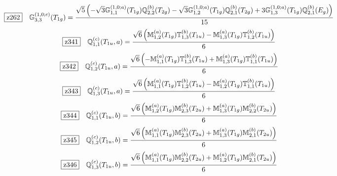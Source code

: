 \documentclass[fleqn,10pt,landscape]{jsarticle}
\begin{document}
\begin{dmath*}
\hspace*{3mm}\fbox{z262}\quad \mathbb{G}_{3,3}^{(1,0;c)}(T_{1g})=\frac{\sqrt{5} \left(- \sqrt{3} \mathbb{G}_{1,1}^{(1,0;a)}(T_{1g}) \mathbb{Q}_{2,2}^{(b)}(T_{2g}) - \sqrt{3} \mathbb{G}_{1,2}^{(1,0;a)}(T_{1g}) \mathbb{Q}_{2,1}^{(b)}(T_{2g}) + 3 \mathbb{G}_{1,3}^{(1,0;a)}(T_{1g}) \mathbb{Q}_{2,1}^{(b)}(E_{g})\right)}{15}
\end{dmath*}
\begin{dmath*}
\hspace*{3mm}\fbox{z341}\quad \mathbb{Q}_{1,1}^{(c)}(T_{1u},a)=\frac{\sqrt{6} \left(\mathbb{M}_{1,2}^{(a)}(T_{1g}) \mathbb{T}_{1,3}^{(b)}(T_{1u}) - \mathbb{M}_{1,3}^{(a)}(T_{1g}) \mathbb{T}_{1,2}^{(b)}(T_{1u})\right)}{6}
\end{dmath*}
\begin{dmath*}
\hspace*{3mm}\fbox{z342}\quad \mathbb{Q}_{1,2}^{(c)}(T_{1u},a)=\frac{\sqrt{6} \left(- \mathbb{M}_{1,1}^{(a)}(T_{1g}) \mathbb{T}_{1,3}^{(b)}(T_{1u}) + \mathbb{M}_{1,3}^{(a)}(T_{1g}) \mathbb{T}_{1,1}^{(b)}(T_{1u})\right)}{6}
\end{dmath*}
\begin{dmath*}
\hspace*{3mm}\fbox{z343}\quad \mathbb{Q}_{1,3}^{(c)}(T_{1u},a)=\frac{\sqrt{6} \left(\mathbb{M}_{1,1}^{(a)}(T_{1g}) \mathbb{T}_{1,2}^{(b)}(T_{1u}) - \mathbb{M}_{1,2}^{(a)}(T_{1g}) \mathbb{T}_{1,1}^{(b)}(T_{1u})\right)}{6}
\end{dmath*}
\begin{dmath*}
\hspace*{3mm}\fbox{z344}\quad \mathbb{Q}_{1,1}^{(c)}(T_{1u},b)=\frac{\sqrt{6} \left(\mathbb{M}_{1,2}^{(a)}(T_{1g}) \mathbb{M}_{2,3}^{(b)}(T_{2u}) + \mathbb{M}_{1,3}^{(a)}(T_{1g}) \mathbb{M}_{2,2}^{(b)}(T_{2u})\right)}{6}
\end{dmath*}
\begin{dmath*}
\hspace*{3mm}\fbox{z345}\quad \mathbb{Q}_{1,2}^{(c)}(T_{1u},b)=\frac{\sqrt{6} \left(\mathbb{M}_{1,1}^{(a)}(T_{1g}) \mathbb{M}_{2,3}^{(b)}(T_{2u}) + \mathbb{M}_{1,3}^{(a)}(T_{1g}) \mathbb{M}_{2,1}^{(b)}(T_{2u})\right)}{6}
\end{dmath*}
\begin{dmath*}
\hspace*{3mm}\fbox{z346}\quad \mathbb{Q}_{1,3}^{(c)}(T_{1u},b)=\frac{\sqrt{6} \left(\mathbb{M}_{1,1}^{(a)}(T_{1g}) \mathbb{M}_{2,2}^{(b)}(T_{2u}) + \mathbb{M}_{1,2}^{(a)}(T_{1g}) \mathbb{M}_{2,1}^{(b)}(T_{2u})\right)}{6}
\end{dmath*}
\end{document}
